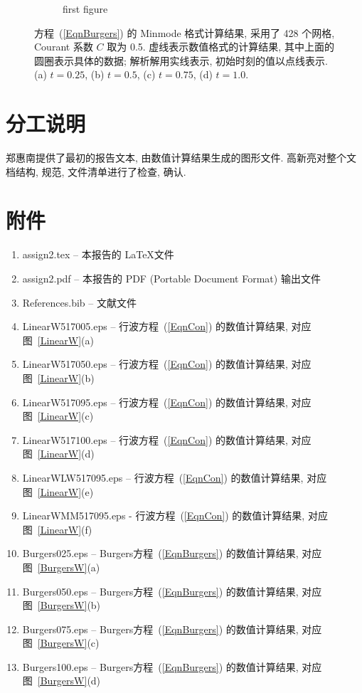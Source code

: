 \documentclass[10.5pt
]{article}
\begin{document}
\begin{figure}
\begin{subfigure}{.9\linewidth}
  \caption{first figure}
  \label{fig:problem2-4}
\end{subfigure}
\caption{%
  方程~(\ref{EqnBurgers}) 的 Minmode 格式计算结果, 采用了 428 个网格, Courant 系数 $C$ 取为 0.5. 虚线表示数值格式的计算结果, 其中上面的圆圈表示具体的数据;
  解析解用实线表示, 初始时刻的值以点线表示. (a) $t=0.25$, (b) $t=0.5$, (c) $t=0.75$, (d) $t=1.0$.
}
  \label{fig:problem2-summary}%
\end{figure}

\section{分工说明}

郑惠南提供了最初的报告文本, 由数值计算结果生成的图形文件. 高新亮对整个文档结构, 规范, 文件清单进行了检查, 确认.

\section{附件}

\begin{enumerate}
\item
assign2.tex -- 本报告的 \LaTeX 文件
\item
assign2.pdf -- 本报告的 PDF (Portable Document Format) 输出文件
\item
References.bib -- 文献文件
\item
LinearW517005.eps -- 行波方程~(\ref{EqnCon}) 的数值计算结果, 对应图~\ref{LinearW}(a)
\item
LinearW517050.eps -- 行波方程~(\ref{EqnCon}) 的数值计算结果, 对应图~\ref{LinearW}(b)
\item
LinearW517095.eps -- 行波方程~(\ref{EqnCon}) 的数值计算结果, 对应图~\ref{LinearW}(c)
\item
LinearW517100.eps -- 行波方程~(\ref{EqnCon}) 的数值计算结果, 对应图~\ref{LinearW}(d)
\item
LinearWLW517095.eps -- 行波方程~(\ref{EqnCon}) 的数值计算结果, 对应图~\ref{LinearW}(e)
\item
LinearWMM517095.eps - 行波方程~(\ref{EqnCon}) 的数值计算结果, 对应图~\ref{LinearW}(f)
\item
Burgers025.eps -- Burgers方程~(\ref{EqnBurgers}) 的数值计算结果, 对应图~\ref{BurgersW}(a)
\item
Burgers050.eps -- Burgers方程~(\ref{EqnBurgers}) 的数值计算结果, 对应图~\ref{BurgersW}(b)
\item
Burgers075.eps -- Burgers方程~(\ref{EqnBurgers}) 的数值计算结果, 对应图~\ref{BurgersW}(c)
\item
Burgers100.eps -- Burgers方程~(\ref{EqnBurgers}) 的数值计算结果, 对应图~\ref{BurgersW}(d)
\end{enumerate}
\end{document}
